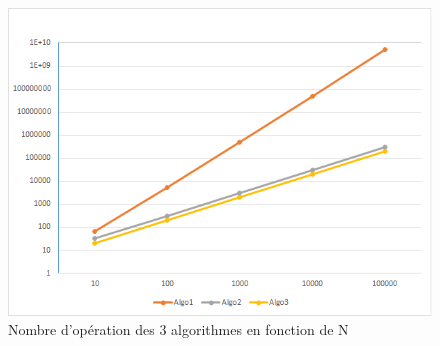 \documentclass[11pt,a4paper]{article}
\begin{document}
\begin{figure}
\caption{Nombre d'opération des 3 algorithmes en fonction de N}
\centering
\includegraphics[width=13cm]{img_graph}
\end{figure}
\end{document}
